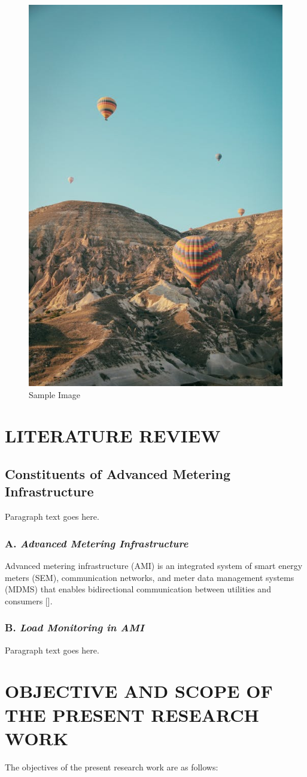 \begin{figure}[htbp]
\centering
\includegraphics[width=0.5\columnwidth]{Chapters/Chapter1/Figures/Actors_SG}
\caption{Sample Image}
\label{Actors_SG}
\end{figure}


\section{LITERATURE REVIEW} %
\subsection{Constituents of Advanced Metering Infrastructure} %
Paragraph text goes here.

\subsubsection*{A. \textit{Advanced Metering Infrastructure}} %
Advanced metering infrastructure (AMI) is an integrated system of smart energy meters (SEM), communication networks, and meter data management systems (MDMS) that enables bidirectional communication between utilities and consumers [\cite{park2010}]. 

\subsubsection*{B. \textit{Load Monitoring in AMI}}
Paragraph text goes here.

\section{OBJECTIVE AND SCOPE OF THE PRESENT RESEARCH WORK} %
\noindent The objectives of the present research work are as follows:

